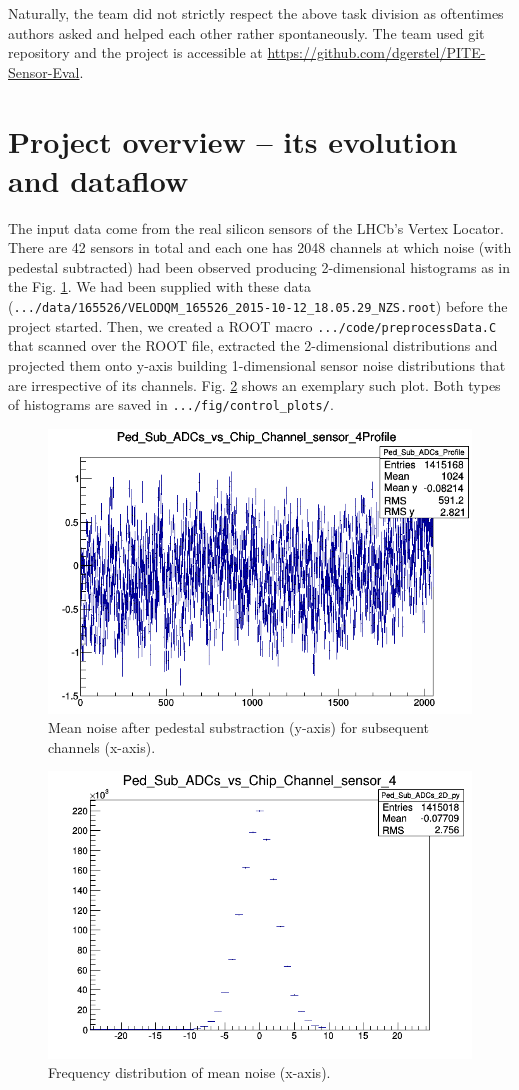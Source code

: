 \documentclass[a4paper,10pt]{article}
\begin{document}
Naturally, the team did not strictly respect the above task division as oftentimes authors asked and helped each other rather spontaneously.
The team used git repository and the project is accessible at \url{https://github.com/dgerstel/PITE-Sensor-Eval}.

\section{Project overview -- its evolution and dataflow}

The input data come from the real silicon sensors of the LHCb's Vertex Locator. There are 42 sensors in total and each one has 2048 channels at which noise (with pedestal subtracted) had been observed producing 2-dimensional histograms as in the Fig. \ref{f:2D}. We had been supplied with these data
\newline (\texttt{.../data/165526/VELODQM\_165526\_2015-10-12\_18.05.29\_NZS.root}) before the project started. Then, we created a ROOT macro \texttt{.../code/preprocessData.C} 
that scanned over the ROOT file, extracted the 2-dimensional distributions and projected them onto y-axis building 1-dimensional sensor noise distributions that are irrespective of its channels. Fig. \ref{f:1D} shows an exemplary such plot.
Both types of histograms are saved in \texttt{.../fig/control\_plots/}.


\begin{figure}[H]
    \centering
    \includegraphics[width=.7\textwidth]{../fig/control_plots/sample_ADC_vs_chann}
    \caption{Mean noise after pedestal substraction (y-axis) for subsequent channels (x-axis).}
    \label{f:2D}
\end{figure}

\begin{figure}[H]
    \centering
    \includegraphics[width=.7\textwidth]{../fig/control_plots/sample_ADC_distr}
    \caption{Frequency distribution of mean noise (x-axis).}
    \label{f:1D}
\end{figure}
\end{document}
